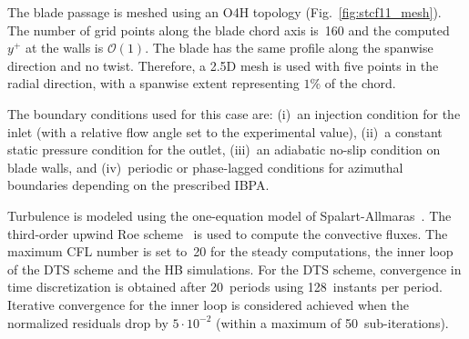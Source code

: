 
The blade passage is meshed using an O4H topology (Fig.~\ref{fig:stcf11_mesh}).  
The number of grid points along the blade
chord axis is~160 and the computed $y^+$ at the walls is $\mathcal{O}(1)$. %
The blade has the same profile along the spanwise direction and no
twist. Therefore, a 2.5D mesh is used with five points in the radial direction, with a spanwise
extent representing $1\%$ of the chord. 

The boundary conditions used for this case are: (i)~an
injection condition  for the inlet (with a relative flow angle
set to the  experimental value), (ii)~a constant static pressure
condition for the outlet,  (iii)~an adiabatic no-slip condition on
blade walls, and (iv)~periodic or phase-lagged conditions for azimuthal boundaries depending on the  
prescribed IBPA.

Turbulence is modeled using the one-equation model of
Spalart-Allmaras~\cite{Spalart1992}.  The third-order upwind Roe
scheme~\cite{Roe1981} is used to compute the convective fluxes.
The maximum
CFL number is set to~20 for the steady computations,  the inner loop
of the DTS scheme and the HB simulations.  For the DTS scheme,  
convergence in time discretization is obtained
after 20~periods using 128~instants per period.  Iterative convergence 
for the inner loop is considered achieved when the normalized
residuals drop by $5\cdot 10^{-2}$ (within a maximum of
50~sub-iterations).